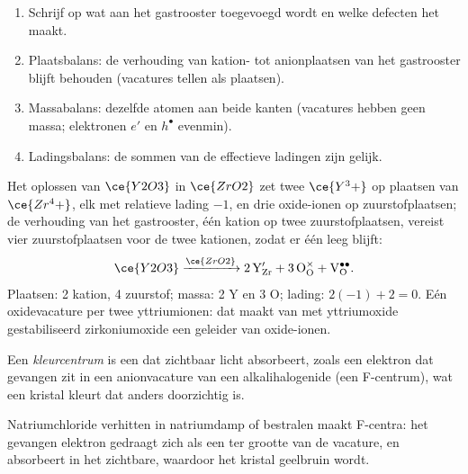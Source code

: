\begin{method}\label{met:b3:solid-state:kroger-vink}
\begin{enumerate}
  \item Schrijf op wat aan het gastrooster toegevoegd wordt en welke
        defecten het maakt.
  \item Plaatsbalans: de verhouding van kation- tot anionplaatsen van het
        gastrooster blijft behouden (vacatures tellen als plaatsen).
  \item Massabalans: dezelfde atomen aan beide kanten (vacatures hebben
        geen massa;
        elektronen $e'$ en  $h^\bullet$ evenmin).
  \item Ladingsbalans: de sommen van de effectieve ladingen zijn gelijk.
\end{enumerate}
\end{method}

\begin{example}
Het oplossen van $\ce{Y2O3}$ in $\ce{ZrO2}$ zet twee $\ce{Y^3+}$ op plaatsen van $\ce{Zr^4+}$, elk met relatieve lading $-1$, en
drie oxide-ionen op zuurstofplaatsen; de verhouding van het gastrooster,
één kation op twee zuurstofplaatsen, vereist vier zuurstofplaatsen voor
de twee kationen, zodat er één leeg blijft:
\[
  \ce{Y2O3} \xrightarrow{\ce{ZrO2}} \mathrm{2\,Y_{Zr}' + 3\,O_O^{\times} + V_O^{\bullet\bullet}}.
\]
Plaatsen: 2 kation, 4 zuurstof; massa: 2 Y en 3 O; lading: $2(-1) + 2 = 0$. Eén
oxidevacature per twee yttriumionen: dat maakt van met yttriumoxide
gestabiliseerd zirkoniumoxide een geleider van oxide-ionen.
\end{example}

\begin{definition}[Kleurcentrum]\label{def:b3:solid-state:colour-centre}
Een \emph{kleurcentrum} is een  dat
zichtbaar licht absorbeert, zoals een elektron dat gevangen zit in een
anionvacature van een alkalihalogenide (een F-centrum), wat een kristal
kleurt dat anders doorzichtig is.
\end{definition}

Natriumchloride verhitten in natriumdamp of bestralen maakt F-centra: het
gevangen elektron gedraagt zich als een  ter grootte
van de vacature, en absorbeert in het zichtbare, waardoor het kristal
geelbruin wordt.

